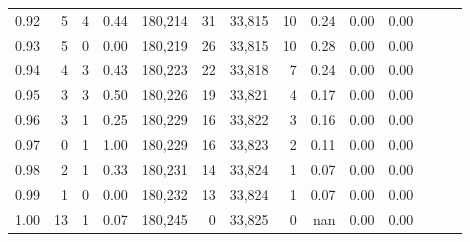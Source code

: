 \begin{tabular}{rrrrrrrrrrrrrr}
0.92 &      5 &      4 &  0.44 &  180,214 &       31 &  33,815 &      10 &  0.24 &  0.00 &      0.00 \\
0.93 &      5 &      0 &  0.00 &  180,219 &       26 &  33,815 &      10 &  0.28 &  0.00 &      0.00 \\
0.94 &      4 &      3 &  0.43 &  180,223 &       22 &  33,818 &       7 &  0.24 &  0.00 &      0.00 \\
0.95 &      3 &      3 &  0.50 &  180,226 &       19 &  33,821 &       4 &  0.17 &  0.00 &      0.00 \\
0.96 &      3 &      1 &  0.25 &  180,229 &       16 &  33,822 &       3 &  0.16 &  0.00 &      0.00 \\
0.97 &      0 &      1 &  1.00 &  180,229 &       16 &  33,823 &       2 &  0.11 &  0.00 &      0.00 \\
0.98 &      2 &      1 &  0.33 &  180,231 &       14 &  33,824 &       1 &  0.07 &  0.00 &      0.00 \\
0.99 &      1 &      0 &  0.00 &  180,232 &       13 &  33,824 &       1 &  0.07 &  0.00 &      0.00 \\
1.00 &     13 &      1 &  0.07 &  180,245 &        0 &  33,825 &       0 &   nan &  0.00 &      0.00 \\
\bottomrule
\end{tabular}
